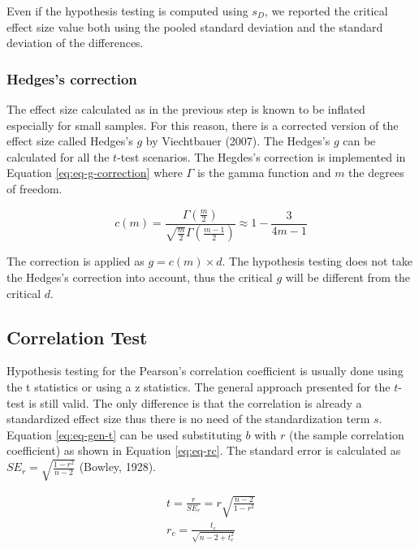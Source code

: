 \documentclass[
  man,floatsintext]{apa7}
\begin{document}
Even if the hypothesis testing is computed using \(s_D\), we reported the critical effect size value both using the pooled standard deviation and the standard deviation of the differences.

\subsubsection{Hedges's correction}\label{hedgess-correction}

The effect size calculated as in the previous step is known to be inflated especially for small samples. For this reason, there is a corrected version of the effect size called Hedges's \(g\) by Viechtbauer (2007). The Hedges's \(g\) can be calculated for all the \(t\)-test scenarios. The Hegdes's correction is implemented in Equation \eqref{eq:eq-g-correction} where \(\Gamma\) is the gamma function and \(m\) the degrees of freedom.

\begin{equation}
\label{eq:eq-g-correction}
c(m) = \frac{\Gamma\left(\frac{m}{2}\right)}{\sqrt{\frac{m}{2}} \Gamma\left(\frac{m-1}{2}\right)} \approx 1 - \frac{3}{4m - 1}
\end{equation}

The correction is applied as \(g = c(m) \times d\). The hypothesis testing does not take the Hedges's correction into account, thus the critical \(g\) will be different from the critical \(d\).

\subsection{Correlation Test}\label{correlation-test}

Hypothesis testing for the Pearson's correlation coefficient is usually done using the t statistics or using a z statistics. The general approach presented for the \(t\)-test is still valid. The only difference is that the correlation is already a standardized effect size thus there is no need of the standardization term \(s\). Equation \eqref{eq:eq-gen-t} can be used substituting \(b\) with \(r\) (the sample correlation coefficient) as shown in Equation \eqref{eq:eq-rc}. The standard error is calculated as \(SE_r = \sqrt{\frac{1 - r^2}{n - 2}}\) (Bowley, 1928).

\begin{equation}
\label{eq:eq-rc}
    \begin{gathered}
        t = \frac{r}{SE_r} = r \sqrt{\frac{n - 2}{1 - r^2}} \\
        r_c = \frac{t_c}{\sqrt{n - 2 + t_c^2}}
    \end{gathered}
\end{equation}
\end{document}
